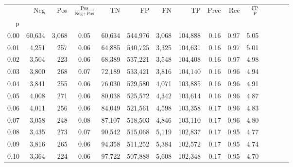 \begin{tabular}{rrrcrrrrrrrrrrr}
\toprule
{} &     Neg &     Pos & $\frac{\text{Pos}}{\text{Neg}+\text{Pos}}$ &       TN &       FP &       FN &       TP &  Prec &   Rec & $\frac{\text{FP}}{\text{P}}$ \\
p    &         &         &                                            &          &          &          &          &       &       &                              \\
\midrule
0.00 &  60,634 &   3,068 &                                       0.05 &   60,634 &  544,976 &    3,068 &  104,888 &  0.16 &  0.97 &                         5.05 \\
0.01 &   4,251 &     257 &                                       0.06 &   64,885 &  540,725 &    3,325 &  104,631 &  0.16 &  0.97 &                         5.01 \\
0.02 &   3,504 &     223 &                                       0.06 &   68,389 &  537,221 &    3,548 &  104,408 &  0.16 &  0.97 &                         4.98 \\
0.03 &   3,800 &     268 &                                       0.07 &   72,189 &  533,421 &    3,816 &  104,140 &  0.16 &  0.96 &                         4.94 \\
0.04 &   3,841 &     255 &                                       0.06 &   76,030 &  529,580 &    4,071 &  103,885 &  0.16 &  0.96 &                         4.91 \\
0.05 &   4,008 &     271 &                                       0.06 &   80,038 &  525,572 &    4,342 &  103,614 &  0.16 &  0.96 &                         4.87 \\
0.06 &   4,011 &     256 &                                       0.06 &   84,049 &  521,561 &    4,598 &  103,358 &  0.17 &  0.96 &                         4.83 \\
0.07 &   3,058 &     248 &                                       0.08 &   87,107 &  518,503 &    4,846 &  103,110 &  0.17 &  0.96 &                         4.80 \\
0.08 &   3,435 &     273 &                                       0.07 &   90,542 &  515,068 &    5,119 &  102,837 &  0.17 &  0.95 &                         4.77 \\
0.09 &   3,816 &     265 &                                       0.06 &   94,358 &  511,252 &    5,384 &  102,572 &  0.17 &  0.95 &                         4.74 \\
0.10 &   3,364 &     224 &                                       0.06 &   97,722 &  507,888 &    5,608 &  102,348 &  0.17 &  0.95 &                         4.70 \\

\end{tabular}
